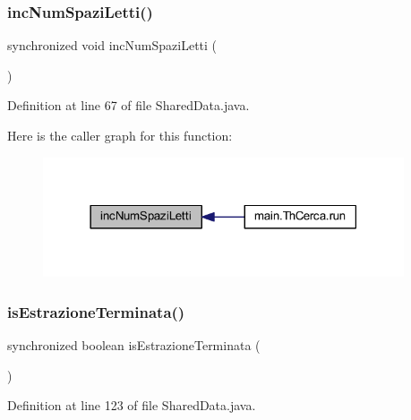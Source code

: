 \subsubsection{\texorpdfstring{inc\+Num\+Spazi\+Letti()}{incNumSpaziLetti()}}
{\footnotesize\ttfamily synchronized void inc\+Num\+Spazi\+Letti (\begin{DoxyParamCaption}{ }\end{DoxyParamCaption})}



Definition at line 67 of file Shared\+Data.\+java.

Here is the caller graph for this function\+:
\nopagebreak
\begin{figure}[H]
\begin{center}
\leavevmode
\includegraphics[width=302pt]{classmain_1_1_shared_data_a437c60e2bd2e1647fc60ed8ec7f6616e_icgraph}
\end{center}
\end{figure}
\mbox{\label{classmain_1_1_shared_data_ae7e5f776048f84d07787d62c1ddcf7d0}} 
\subsubsection{\texorpdfstring{is\+Estrazione\+Terminata()}{isEstrazioneTerminata()}}
{\footnotesize\ttfamily synchronized boolean is\+Estrazione\+Terminata (\begin{DoxyParamCaption}{ }\end{DoxyParamCaption})}



Definition at line 123 of file Shared\+Data.\+java.

